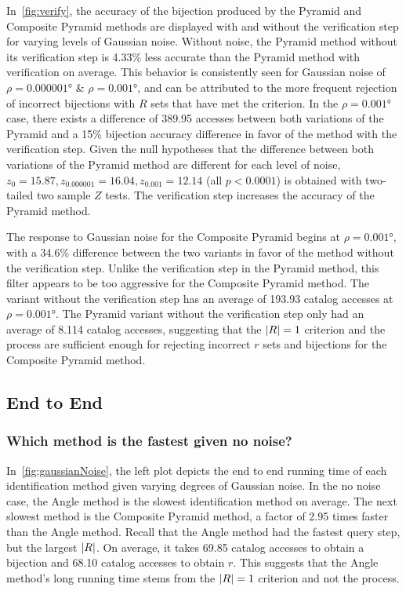 In~\autoref{fig:verify}, the accuracy of the bijection produced by the Pyramid and Composite Pyramid methods are
displayed with and without the verification step for varying levels of Gaussian noise.
Without noise, the Pyramid method without its verification step is 4.33\% less accurate than the Pyramid method with
verification on average.
This behavior is consistently seen for Gaussian noise of $\rho=\ang{0.000001}$ \& $\rho=\ang{0.001}$, and
can be attributed to the more frequent rejection of incorrect bijections with $R$ sets that have met the criterion.
In the $\rho=\ang{0.001}$ case, there exists a difference of 389.95 accesses between both variations of the Pyramid
and a 15\% bijection accuracy difference in favor of the method with the verification step.
Given the null hypotheses that the difference between both variations of the Pyramid method are different for each level
of noise, $z_0 = 15.87, z_{0.000001} = 16.04, z_{0.001} = 12.14$ (all $p < 0.0001$) is obtained with two-tailed two
sample $Z$ tests.
The verification step increases the accuracy of the Pyramid method.

The response to Gaussian noise for the Composite Pyramid begins at $\rho=\ang{0.001}$, with a 34.6\% difference
between the two variants in favor of the method without the verification step.
Unlike the verification step in the Pyramid method, this filter appears to be too aggressive for the Composite Pyramid
method.
The variant without the verification step has an average of 193.93 catalog accesses at $\rho=\ang{0.001}$.
The Pyramid variant without the verification step only had an average of 8.114 catalog accesses, suggesting that the
$\left| R \right| = 1$ criterion and the  process are sufficient enough for rejecting incorrect $r$ sets and
bijections for the Composite Pyramid method.

\subsection{End to End}\label{subsec:endToEndEvaluation}
\subsubsection{Which method is the fastest given no noise?}
In~\autoref{fig:gaussianNoise}, the left plot depicts the end to end running time of each identification method given
varying degrees of Gaussian noise.
In the no noise case, the Angle method is the slowest identification method on average.
The next slowest method is the Composite Pyramid method, a factor of 2.95 times faster than the Angle method.
Recall that the Angle method had the fastest query step, but the largest $\left| R \right|$.
On average, it takes 69.85 catalog accesses to obtain a bijection and 68.10 catalog accesses to obtain $r$.
This suggests that the Angle method's long running time stems from the $\left| R \right| = 1$ criterion and not the 
process.

